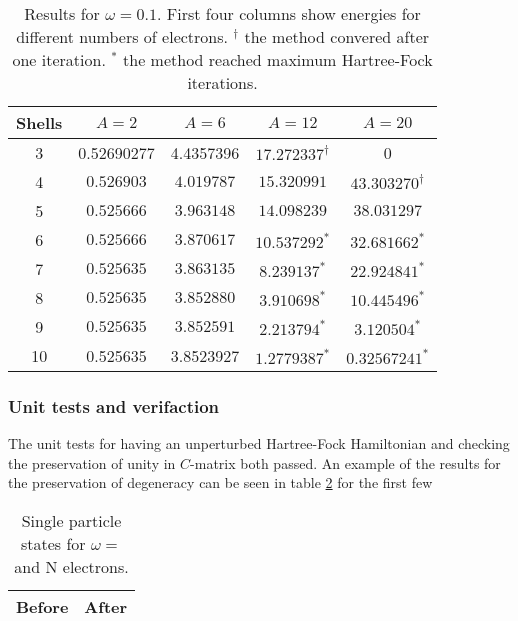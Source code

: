 \documentclass[11pt]{article}
\newcommand{\husk}[1]{\color{red} #1 \color{black}}
\begin{document}
\begin{table}[H]
	\centering
	\caption{Results for $\omega = 0.1$. First four columns show energies for different numbers of electrons. $^\dagger$ the method convered after one iteration. $^*$ the method reached maximum Hartree-Fock iterations.}
	\begin{tabular}{c c c c c}
		\\ \hline \hline
		Shells 	& $A = 2$	& $A = 6$ 	& $A = 12$ 	& $A = 20$ 	\\ \hline
         3 & 0.52690277 &  4.4357396 &  $17.272337^\dagger$ &          0  \\ 
         4 & $  0.526903$ & $  4.019787$ & $ 15.320991$ & $ 43.303270^\dagger$  \\ 
         5 & $  0.525666$ & $  3.963148$ & $ 14.098239$ & $ 38.031297$  \\ 
         6 & $  0.525666$ & $  3.870617$ & $ 10.537292^*$ & $ 32.681662^*$  \\ 
         7 & $  0.525635$ & $  3.863135$ & $  8.239137^*$ & $ 22.924841^*$  \\ 
         8 & $  0.525635$ & $  3.852880$ & $  3.910698^*$ & $ 10.445496^*$  \\ 
         9 & $  0.525635$ & $  3.852591$ & $  2.213794^*$ & $  3.120504^*$  \\ 
        10 & 0.525635 &  3.8523927 &  $1.2779387^*$ & $0.32567241^*$  \\ 
        \hline \hline
	\end{tabular}
	\label{tab:omega01}
\end{table}

\subsubsection{Unit tests and verifaction}
The unit tests for having an unperturbed Hartree-Fock Hamiltonian and checking the preservation of unity in $C$-matrix both passed. An example of the results for the preservation of degeneracy can be seen in table \ref{tab:sps-energies} for the first few 

\begin{table}[H]
	\centering
	\caption{Single particle states for $\omega=$ and \husk{N} electrons.}
	\begin{tabular}{c c}
		\\ \hline \hline
		Before & After \\ \hline
        \hline \hline
	\end{tabular}
	\label{tab:sps-energies}
\end{table}
\end{document}
